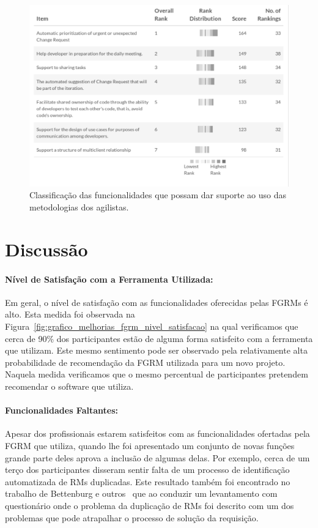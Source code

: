 \begin{figure}[htpb]
	\centering
	\includegraphics[width=0.6\linewidth]{./chapter-pesquisa-com-profissionais/img/grafico_melhorias_fgrm_suporte_particas_ageis.pdf}
	\caption{Classificação das funcionalidades que possam dar suporte ao uso das
	metodologias dos agilistas.}
\label{fig:grafico_melhorias_fgrm_suporte_particas_ageis}
\end{figure}

\section{Discussão}

\paragraph{Nível de Satisfação com a Ferramenta Utilizada:}
\label{par:pesq_profissionais_nivel_de_satisfação}

Em geral, o nível de satisfação com as funcionalidades oferecidas pelas FGRMs é
alto. Esta medida foi observada na
Figura~\ref{fig:grafico_melhorias_fgrm_nivel_satisfacao} na qual verificamos que
cerca de 90\% dos participantes estão de alguma forma satisfeito com a
ferramenta que utilizam. Este mesmo sentimento pode ser observado pela
relativamente alta probabilidade de recomendação da FGRM utilizada para um novo
projeto. Naquela medida verificamos que o mesmo percentual de participantes
pretendem recomendar o software que utiliza.

\paragraph{Funcionalidades Faltantes:}
\label{par:pesq_profissionais_funcionalidades_faltantes}

Apesar dos profissionais estarem satisfeitos com as funcionalidades ofertadas
pela FGRM que utiliza, quando lhe foi apresentado um conjunto de novas funções
grande parte deles aprova a inclusão de algumas delas. Por exemplo,
cerca de um terço dos participantes disseram sentir falta de um processo de
identificação automatizada de RMs duplicadas. Este resultado também foi encontrado
no trabalho de Bettenburg e outros~\cite{bettenburg2008makes} que ao conduzir um
levantamento com questionário onde o problema da duplicação de RMs foi descrito
com um dos problemas que pode atrapalhar o processo de solução da requisição.

